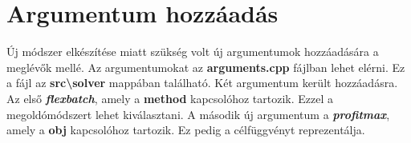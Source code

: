 \section{Argumentum hozzáadás}
Új módszer elkészítése miatt szükség volt új argumentumok hozzáadására a meglévők mellé. Az argumentumokat az \textbf{arguments.cpp} fájlban lehet elérni. Ez a fájl az \textbf{src\textbackslash solver} mappában található. Két argumentum került hozzáadásra. Az első \textbf{\textit{flexbatch}}, amely a \textbf{method} kapcsolóhoz tartozik. Ezzel a megoldómódszert lehet kiválasztani. A második új argumentum a \textbf{\textit{profit\textunderscore max}}, amely a \textbf{obj} kapcsolóhoz tartozik. Ez pedig a célfüggvényt reprezentálja.



	